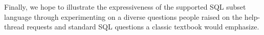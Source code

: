 Finally, we hope to illustrate the expressiveness of the supported SQL
subset language through experimenting on a diverse questions
people raised on the help-thread requests and standard
SQL questions a classic textbook would emphasize.


